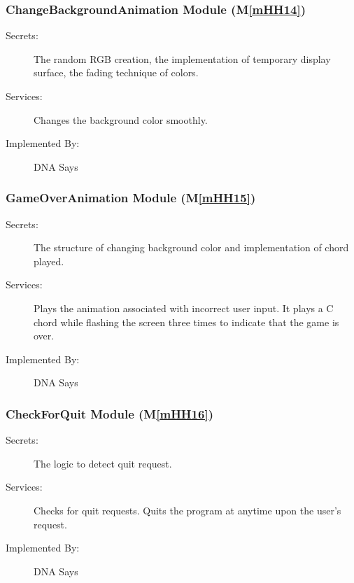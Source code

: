 \documentclass[12pt, titlepage]{article}
\newcommand{\mref}[1]{M\ref{#1}}
\begin{document}
\subsubsection{ChangeBackgroundAnimation Module (\mref{mHH14})}
\begin{description}
\item[Secrets:]The random RGB creation, the implementation of temporary display surface, the fading technique of colors.
\item[Services:]Changes the background color smoothly.
\item[Implemented By:] DNA Says
\end{description}

\subsubsection{GameOverAnimation Module (\mref{mHH15})}
\begin{description}
\item[Secrets:]The structure of changing background color and implementation of chord played.
\item[Services:]Plays the animation associated with incorrect user input. It plays a C chord while flashing the screen three times to indicate that the game is over.
\item[Implemented By:] DNA Says
\end{description}

\subsubsection{CheckForQuit Module (\mref{mHH16})}
\begin{description}
\item[Secrets:]The logic to detect quit request.
\item[Services:]Checks for quit requests. Quits the program at anytime upon the user's request.
\item[Implemented By:] DNA Says
\end{description}
\end{document}
